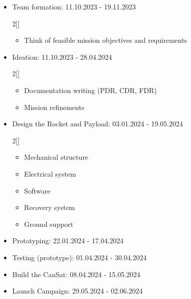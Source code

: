 \begin{itemize}[leftmargin=1cm, itemindent=0.25cm, noitemsep, topsep=0pt, label=$\bullet$]
\item Team formation: 11.10.2023 - 19.11.2023
\begin{multicols}{2}[\vspace{-0.75\baselineskip}]
\begin{itemize}[label=, noitemsep, topsep=2pt]
\item Think of feasible mission objectives and requirements
\end{itemize}
\end{multicols}
\vspace*{-0.75\baselineskip}
\item Ideation: 11.10.2023 - 28.04.2024
\begin{multicols}{2}[\vspace{-0.75\baselineskip}]
\begin{itemize}[label=, noitemsep, topsep=2pt]
\item Documentation writing (PDR, CDR, FDR)
\item Mission refinements
\end{itemize}
\end{multicols}
\vspace*{-0.75\baselineskip}
\item Design the Rocket and Payload: 03.01.2024 - 19.05.2024
\begin{multicols}{2}[\vspace{-0.75\baselineskip}]
\begin{itemize}[label=, noitemsep, topsep=2pt]
\item Mechanical structure 
\item Electrical system
\item Software
\item Recovery system
\item Ground support
\end{itemize}
\end{multicols}
\vspace*{-0.75\baselineskip}
\item Prototyping: 22.01.2024 - 17.04.2024
\item Testing (prototype): 01.04.2024 - 30.04.2024
\item Build the CanSat: 08.04.2024 - 15.05.2024
\item Launch Campaign: 29.05.2024 - 02.06.2024
\end{itemize}

